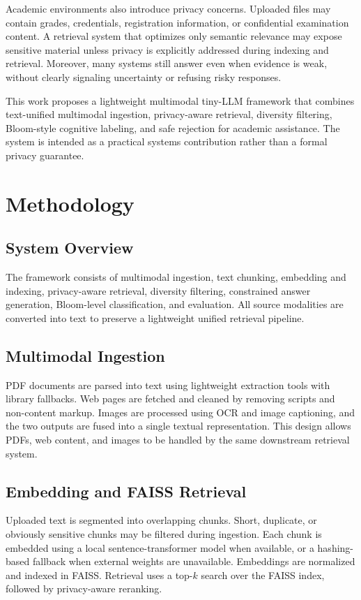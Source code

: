 \documentclass[conference]{IEEEtran}
\begin{document}
Academic environments also introduce privacy concerns. Uploaded files may contain grades, credentials, registration information, or confidential examination content. A retrieval system that optimizes only semantic relevance may expose sensitive material unless privacy is explicitly addressed during indexing and retrieval. Moreover, many systems still answer even when evidence is weak, without clearly signaling uncertainty or refusing risky responses.

This work proposes a lightweight multimodal tiny-LLM framework that combines text-unified multimodal ingestion, privacy-aware retrieval, diversity filtering, Bloom-style cognitive labeling, and safe rejection for academic assistance. The system is intended as a practical systems contribution rather than a formal privacy guarantee.

\section{Methodology}
\subsection{System Overview}
The framework consists of multimodal ingestion, text chunking, embedding and indexing, privacy-aware retrieval, diversity filtering, constrained answer generation, Bloom-level classification, and evaluation. All source modalities are converted into text to preserve a lightweight unified retrieval pipeline.

\subsection{Multimodal Ingestion}
PDF documents are parsed into text using lightweight extraction tools with library fallbacks. Web pages are fetched and cleaned by removing scripts and non-content markup. Images are processed using OCR and image captioning, and the two outputs are fused into a single textual representation. This design allows PDFs, web content, and images to be handled by the same downstream retrieval system.

\subsection{Embedding and FAISS Retrieval}
Uploaded text is segmented into overlapping chunks. Short, duplicate, or obviously sensitive chunks may be filtered during ingestion. Each chunk is embedded using a local sentence-transformer model when available, or a hashing-based fallback when external weights are unavailable. Embeddings are normalized and indexed in FAISS. Retrieval uses a top-$k$ search over the FAISS index, followed by privacy-aware reranking.
\end{document}

